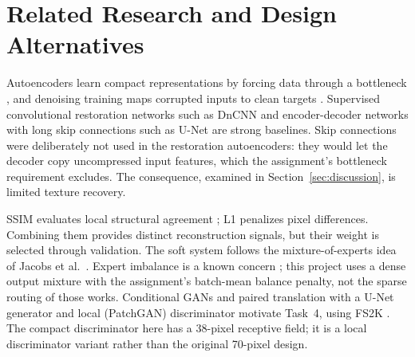 \documentclass[conference]{IEEEtran}
\begin{document}
\section{Related Research and Design Alternatives}
Autoencoders learn compact representations by forcing data through a
bottleneck \cite{hinton}, and denoising training maps corrupted inputs to clean
targets \cite{vincent}. Supervised convolutional restoration networks such as
DnCNN \cite{dncnn} and encoder-decoder networks with long skip connections such
as U-Net \cite{unet} are strong baselines. Skip connections were deliberately
not used in the restoration autoencoders: they would let the decoder copy
uncompressed input features, which the assignment's bottleneck requirement
excludes. The consequence, examined in Section~\ref{sec:discussion}, is limited
texture recovery.

SSIM evaluates local structural agreement \cite{wang}; L1 penalizes pixel
differences. Combining them provides distinct reconstruction signals, but their
weight is selected through validation. The soft system follows the mixture-of-experts
idea of Jacobs et al.\ \cite{jacobs}. Expert imbalance is a known concern
\cite{shazeer,switch}; this project uses a dense output mixture with the
assignment's batch-mean balance penalty, not the sparse routing of those works.
Conditional GANs \cite{gan,cgan} and paired translation with a U-Net generator
and local (PatchGAN) discriminator \cite{isola} motivate Task~4, using FS2K
\cite{fs2kpaper}. The compact discriminator here has a 38-pixel receptive
field; it is a local discriminator variant rather than the original 70-pixel design.
\end{document}
